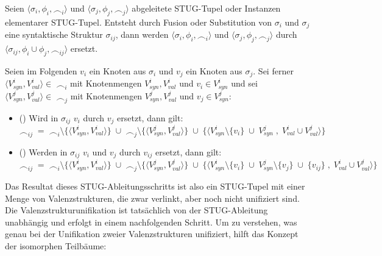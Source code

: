 \begin{definition}
Seien $\langle \sigma_i, \phi_i, \frown_i \rangle$ und $\langle \sigma_j, \phi_j, \frown_j \rangle$ abgeleitete STUG-Tupel oder Instanzen elementarer STUG-Tupel. Entsteht durch Fusion oder Substitution von $\sigma_i$ und $\sigma_j$ eine syntaktische Struktur $\sigma_{ij}$, dann werden $\langle \sigma_i, \phi_i, \frown_i \rangle$ und $\langle \sigma_j, \phi_j, \frown_j \rangle$ durch $\langle \sigma_{ij}, \phi_i \cup \phi_j, \frown_{ij} \rangle$ ersetzt. 

Seien im Folgenden $v_i$ ein Knoten aus $\sigma_i$ und $v_j$ ein Knoten aus $\sigma_j$. Sei ferner $\langle V_{\mathit{syn}}^i, V_{\mathit{val}}^i \rangle \in \; \frown_i$ mit Knotenmengen $V_{\mathit{syn}}^i, V_{\mathit{val}}^i$ und $v_i \in V_{\mathit{syn}}^i$ und sei $\langle V_{\mathit{syn}}^j, V_{\mathit{val}}^j \rangle \in \; \frown_j$ mit Knotenmengen $V_{\mathit{syn}}^j, V_{\mathit{val}}^j$ und $v_j \in V_{\mathit{syn}}^j$:

\begin{itemize}
\item () Wird in $\sigma_{ij}$ $v_i$ durch $v_j$ ersetzt, dann gilt: \\
$\frown_{ij} \; = \; \frown_i \setminus \{\langle V_{\mathit{syn}}^i, V_{\mathit{val}}^i \rangle\} \; \cup \;\frown_j \setminus \{\langle V_{\mathit{syn}}^j, V_{\mathit{val}}^j \rangle\} \; \cup \; \{\langle V_{\mathit{syn}}^i \setminus \{v_i\} \; \cup \; V_{\mathit{syn}}^j \; , \; V_{\mathit{val}}^i \cup V_{\mathit{val}}^j \rangle\}$
\item () Werden in $\sigma_{ij}$ $v_i$ und $v_j$ durch $v_{ij}$ ersetzt, dann gilt: \\
$\frown_{ij} \; = \; \frown_i \setminus \{\langle V_{\mathit{syn}}^i, V_{\mathit{val}}^i \rangle\} \; \cup \; \frown_j \setminus \{\langle V_{\mathit{syn}}^j, V_{\mathit{val}}^j \rangle\} \; \cup \; \{\langle V_{\mathit{syn}}^i \setminus \{v_i\} \; \cup \; V_{\mathit{syn}}^j \setminus \{v_j\} \; \cup \; \{v_{ij}\} \; , \; V_{\mathit{val}}^i \cup V_{\mathit{val}}^j \rangle\}$
\end{itemize} 

\end{definition}   
Das Resultat dieses STUG-Ableitungsschritts ist also ein STUG-Tupel mit einer Menge von Valenzstrukturen, die zwar verlinkt, aber noch nicht unifiziert sind. Die Valenzstrukturunifikation ist tatsächlich von der STUG-Ableitung unabhängig und erfolgt in einem nachfolgenden Schritt. Um zu verstehen, was genau bei der Unifikation zweier Valenzstrukturen unifiziert, hilft das Konzept der isomorphen Teilbäume:  

